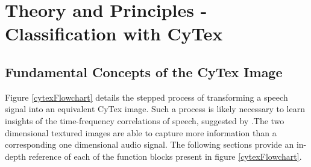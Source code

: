 \chapter{Theory and Principles - Classification with CyTex}\label{ch-theory}
\section{Fundamental Concepts of the CyTex Image}
Figure \ref{cytexFlowchart} details the stepped process of transforming a speech signal into an equivalent CyTex image. Such a process is likely necessary to learn insights of the time-frequency correlations of speech, suggested by \cite{zhang2017speech}.The two dimensional textured images are able to capture more information than a corresponding one dimensional audio signal. The following sections provide an in-depth reference of each of the function blocks present in figure \ref{cytexFlowchart}. 
